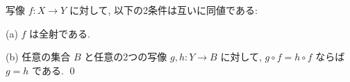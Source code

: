 \documentclass[12pt,twoside]{jarticle}
\begin{document}
\begin{question}[10点]
写像 $f \colon X \to Y$ に対して, 以下の2条件は互いに同値である:
\par\medskip\noindent
(a) $f$ は全射である.
\par\medskip\noindent
(b) 任意の集合 $B$ と任意の2つの写像 $g,h \colon Y \to B$ に対して,
$g \circ f = h \circ f$ ならば $g = h$ である.
\qed
\end{question}


%
%
%
%
%

\end{document}
